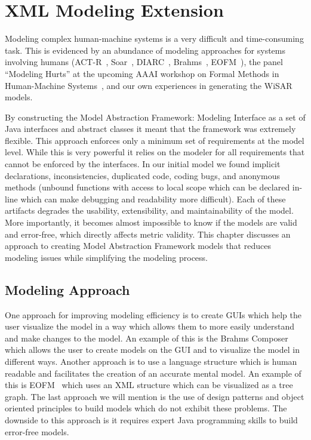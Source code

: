 \chapter{XML Modeling Extension} \label{ch:xmlparser}

Modeling complex human-machine systems is a very difficult and time-consuming task.  This is evidenced by an abundance of modeling approaches for systems involving humans (ACT-R~\cite{anderson1996act}, Soar~\cite{laird2012soar}, DIARC~\cite{schermerhorn2006diarc}, Brahms~\cite{clancey1998brahms}, EOFM~\cite{bolton2009enhanced}), the panel ``Modeling Hurts'' at the upcoming AAAI workshop on Formal Methods in Human-Machine Systems~\cite{aaaisymposium2014modeling}, and our own experiences in generating the WiSAR models.

By constructing the Model Abstraction Framework: Modeling Interface as a set of Java interfaces and abstract classes it meant that the framework was extremely flexible.  This approach enforces only a minimum set of requirements at the model level.  While this is very powerful it relies on the modeler for all requirements that cannot be enforced by the interfaces.  In our initial model we found implicit declarations, inconsistencies, duplicated code, coding bugs, and anonymous methods (unbound functions with access to local scope which can be declared in-line which can make debugging and readability more difficult).  Each of these artifacts degrades the usability, extensibility, and maintainability of the model.  More importantly, it becomes almost impossible to know if the models are valid and error-free, which directly affects metric validity.  This chapter discusses an approach to creating Model Abstraction Framework models that reduces modeling issues while simplifying the modeling process.

\section{Modeling Approach}

One approach for improving modeling efficiency is to create GUIs which help the user visualize the model in a way which allows them to more easily understand and make changes to the model.  An example of this is the Brahms Composer~\cite{seah2005multi} which allows the user to create models on the GUI and to visualize the model in different ways.  Another approach is to use a language structure which is human readable and facilitates the creation of an accurate mental model.  An example of this is EOFM~\cite{bolton2009enhanced} which uses an XML structure which can be visualized as a tree graph.  The last approach we will mention is the use of design patterns and object oriented principles to build models which do not exhibit these problems.  The downside to this approach is it requires expert Java programming skills to build error-free models.

